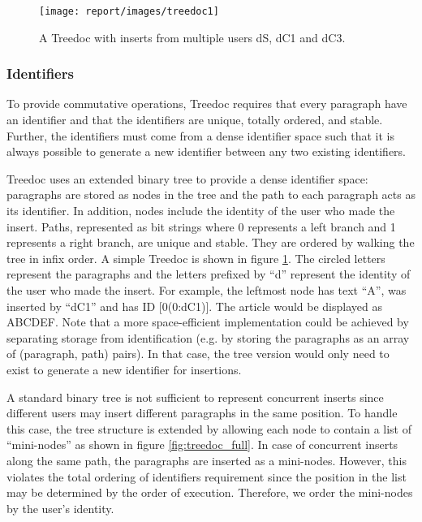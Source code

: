 \documentclass[twocolumn]{article}
\begin{document}
\begin{figure}[tbh!]
  \centering
  \texttt{[image: report/images/treedoc1]}
  \caption{A Treedoc with inserts from multiple users dS, dC1 and dC3.\label{fig:treedoc_basic}}
\end{figure}

\subsubsection{Identifiers}
To provide commutative operations, Treedoc requires that every paragraph have an identifier and that the identifiers are unique, totally ordered, and stable. Further, the identifiers must come from a dense identifier space such that it is always possible to generate a new identifier between any two existing identifiers.

Treedoc uses an extended binary tree to provide a dense identifier space: paragraphs are stored as nodes in the tree and the path to each paragraph acts as its identifier. In addition, nodes include the identity of the user who made the insert. Paths, represented as bit strings where 0 represents a left branch and 1 represents a right branch, are unique and stable. They are ordered by walking the tree in infix order. A simple Treedoc is shown in figure \ref{fig:treedoc_basic}. The circled letters represent the paragraphs and the letters prefixed by \enquote{d} represent the identity of the user who made the insert. For example, the leftmost node has text \enquote{A}, was inserted by \enquote{dC1} and has ID [0(0:dC1)]. The article would be displayed as ABCDEF. Note that a more space-efficient implementation could be achieved by separating storage from identification (e.g. by storing the paragraphs as an array of (paragraph, path) pairs). In that case, the tree version would only need to exist to generate a new identifier for insertions.

A standard binary tree is not sufficient to represent concurrent inserts since different users may insert different paragraphs in the same position. To handle this case, the tree structure is extended by allowing each node to contain a list of \enquote{mini-nodes} as shown in figure \ref{fig:treedoc_full}. In case of concurrent inserts along the same path, the paragraphs are inserted as a mini-nodes. However, this violates the total ordering of identifiers requirement since the position in the list may be determined by the order of execution. Therefore, we order the mini-nodes by the user's identity.
\end{document}
